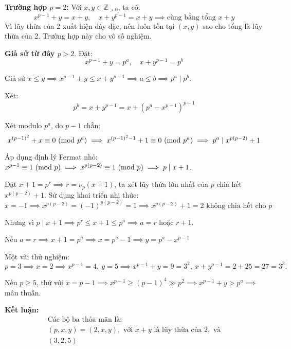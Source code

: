 \documentclass[../05-modular-arithmetic-a.tex]{subfiles}
\begin{document}
\begin{soln}\footnotemark
	\textbf{Trường hợp \( p = 2 \):} Với \( x, y \in \mathbb{Z}_{>0} \), ta có:
	\[
		x^{p-1} + y = x + y,\quad x + y^{p-1} = x + y
	\implies \text{cùng bằng tổng } x + y
	\]
	Vì lũy thừa của 2 xuất hiện dày đặc, nên luôn tồn tại \( (x, y) \) sao cho tổng là lũy thừa của 2. Trường hợp này cho vô số nghiệm.

	\textbf{Giả sử từ đây \( p > 2 \)}. Đặt:
	\[
		x^{p-1} + y = p^a,\quad x + y^{p-1} = p^b
	\]

	Giả sử \( x \le y \implies x^{p-1} + y \le x + y^{p-1} \implies a \le b \implies p^a \mid p^b \).

	Xét:
	\[
		p^b = x + y^{p-1} = x + (p^a - x^{p-1})^{p-1}
	\]

	Xét modulo \( p^a \), do \( p - 1 \) chẵn:
	\[
		x^{(p-1)^2} + x \equiv 0 \ (\mathrm{mod}\ p^a)
	\implies x^{(p-1)^2 - 1} + 1 \equiv 0 \ (\mathrm{mod}\ p^a)
	\implies p^a \mid x^{p(p - 2)} + 1
	\]

	Áp dụng định lý Fermat nhỏ: \( x^{p-1} \equiv 1 \ (\mathrm{mod}\ p) \implies x^{p(p - 2)} \equiv 1 \ (\mathrm{mod}\ p) \implies p \mid x + 1 \).

	Đặt \( x + 1 = p^r \implies r = \nu_p(x + 1) \), ta xét lũy thừa lớn nhất của \( p \) chia hết \( x^{p(p - 2)} + 1 \).  
	Sử dụng khai triển nhị thức:
	\[
		x = -1 \implies x^{p(p - 2)} = (-1)^{p(p - 2)} = 1 \implies x^{p(p - 2)} + 1 = 2 \text{ không chia hết cho } p
	\]

	Nhưng vì \( p \mid x + 1 \implies p^r \le x + 1 \le p^a \implies a = r \) hoặc \( r + 1 \).

	Nếu \( a = r \implies x + 1 = p^a \implies x = p^a - 1 \implies y = p^a - x^{p-1} \)

	Một vài thử nghiệm:
	\[ p = 3 \implies x = 2 \implies x^{p-1} = 4,\ y = 5 \implies x^{p-1} + y = 9 = 3^2,\ x + y^{p-1} = 2 + 25 = 27 = 3^3. \]

	Nếu \( p \ge 5 \), thử với \( x = p - 1 \implies x^{p-1} \ge (p - 1)^4 \gg p^2 \implies x^{p-1} + y > p^a \implies \) mâu thuẫn.

	\textbf{Kết luận:}
	\[
		\boxed{
			\begin{array}{l}
				\text{Các bộ ba thỏa mãn là:} \\
				(p, x, y) = (2, x, y), \text{ với } x + y \text{ là lũy thừa của } 2, \text{ và} \\
				(3, 2, 5)
			\end{array}
		}
	\]
\end{soln}

\end{document}
